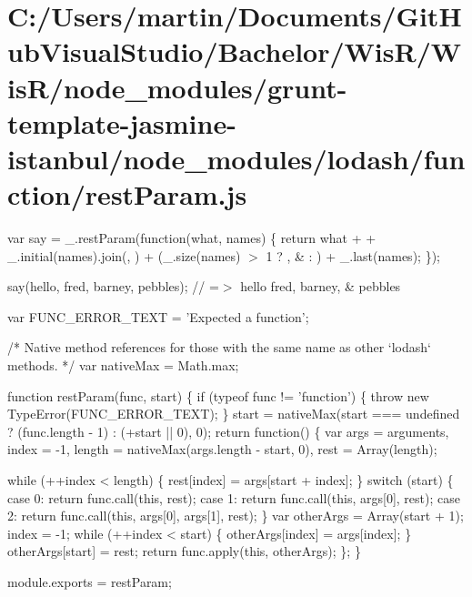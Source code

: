\hypertarget{_c_1_2_users_2martin_2_documents_2_git_hub_visual_studio_2_bachelor_2_wis_r_2_wis_r_2node_modulea407bb2d16a3bdc9d6de2061f81bfc00}{}\section{C\+:/\+Users/martin/\+Documents/\+Git\+Hub\+Visual\+Studio/\+Bachelor/\+Wis\+R/\+Wis\+R/node\+\_\+modules/grunt-\/template-\/jasmine-\/istanbul/node\+\_\+modules/lodash/function/rest\+Param.\+js}
var say = \+\_\+.\+rest\+Param(function(what, names) \{ return what + \textquotesingle{} \textquotesingle{} + \+\_\+.\+initial(names).join(\textquotesingle{}, \textquotesingle{}) + (\+\_\+.\+size(names) $>$ 1 ? \textquotesingle{}, \& \textquotesingle{} \+: \textquotesingle{}\textquotesingle{}) + \+\_\+.\+last(names); \});

say(\textquotesingle{}hello\textquotesingle{}, \textquotesingle{}fred\textquotesingle{}, \textquotesingle{}barney\textquotesingle{}, \textquotesingle{}pebbles\textquotesingle{}); // =$>$ \textquotesingle{}hello fred, barney, \& pebbles\textquotesingle{}


\begin{DoxyCodeInclude}

var FUNC\_ERROR\_TEXT = \textcolor{stringliteral}{'Expected a function'};

\textcolor{comment}{/* Native method references for those with the same name as other `lodash` methods. */}
var nativeMax = Math.max;

\textcolor{keyword}{function} restParam(func, start) \{
  \textcolor{keywordflow}{if} (typeof func != \textcolor{stringliteral}{'function'}) \{
    \textcolor{keywordflow}{throw} \textcolor{keyword}{new} TypeError(FUNC\_ERROR\_TEXT);
  \}
  start = nativeMax(start === undefined ? (func.length - 1) : (+start || 0), 0);
  \textcolor{keywordflow}{return} \textcolor{keyword}{function}() \{
    var args = arguments,
        index = -1,
        length = nativeMax(args.length - start, 0),
        rest = Array(length);

    \textcolor{keywordflow}{while} (++index < length) \{
      rest[index] = args[start + index];
    \}
    \textcolor{keywordflow}{switch} (start) \{
      \textcolor{keywordflow}{case} 0: \textcolor{keywordflow}{return} func.call(\textcolor{keyword}{this}, rest);
      \textcolor{keywordflow}{case} 1: \textcolor{keywordflow}{return} func.call(\textcolor{keyword}{this}, args[0], rest);
      \textcolor{keywordflow}{case} 2: \textcolor{keywordflow}{return} func.call(\textcolor{keyword}{this}, args[0], args[1], rest);
    \}
    var otherArgs = Array(start + 1);
    index = -1;
    \textcolor{keywordflow}{while} (++index < start) \{
      otherArgs[index] = args[index];
    \}
    otherArgs[start] = rest;
    \textcolor{keywordflow}{return} func.apply(\textcolor{keyword}{this}, otherArgs);
  \};
\}

module.exports = restParam;
\end{DoxyCodeInclude}
 